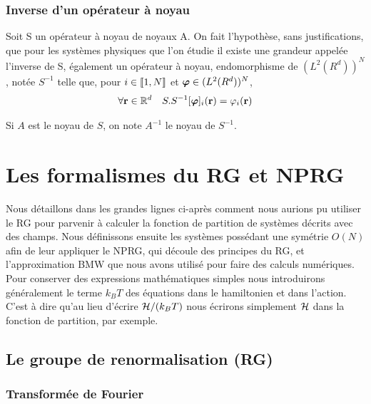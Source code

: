 \documentclass[10.5pt]{article}
\begin{document}
\begin{multicols}{2}
\subsubsection{Inverse d'un opérateur à noyau}

Soit S un opérateur à noyau de noyaux A. On fait l'hypothèse, sans justifications, que pour les systèmes physiques que l'on étudie il existe une grandeur appelée l'inverse de S, également un opérateur à noyau, endomorphisme de $(L^2(R^d))^N$, notée $S^{-1}$ telle que, pour $i \in  \llbracket 1,N \rrbracket $ et $\boldsymbol{ \varphi} \in (L^2(R^d))^N$, 
\begin{equation}
	\forall {\bf r} \in \mathbb{R}^d \quad S.S^{-1}[\boldsymbol{ \varphi}]_i({\bf r}) = \varphi_i ({\bf r})	
\end{equation}

Si $A$ est le noyau de $S$, on note $A^{-1}$ le noyau de $S^{-1}$. \\



\pagebreak


\section{Les formalismes du RG et NPRG}

\label{sec:RGGeneral}

Nous détaillons dans les grandes lignes ci-après comment nous aurions pu utiliser  le RG pour parvenir à calculer la fonction de partition de systèmes décrits avec des champs.  Nous définissons ensuite les systèmes possédant une symétrie $O(N)$ afin de leur appliquer le NPRG, qui découle des principes du RG, et l'approximation BMW que nous avons utilisé pour faire des calculs numériques.\\

Pour conserver des expressions mathématiques simples nous introduirons généralement le terme $k_B T$ des équations dans le hamiltonien et dans l'action. C'est à dire qu'au lieu d'écrire $\mathcal{H}/(k_BT)$ nous écrirons simplement $\mathcal{H}$ dans la fonction de partition, par exemple.


\subsection{Le groupe de renormalisation (RG)}
\subsubsection{Transformée de Fourier}

\label{sec:TF}


\end{multicols}
\end{document}
